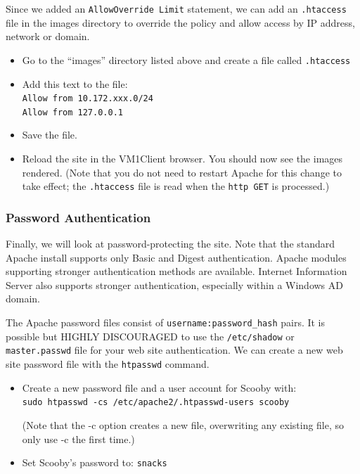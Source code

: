 \documentclass{article}
\begin{document}
Since we added an {\tt AllowOverride Limit} statement, we can add an {\tt .htaccess} file in the images directory to override the policy and allow access by IP address, network or domain. 
\begin{itemize}

\item Go to the ``images'' directory listed above and create a file called {\tt .htaccess}

\item Add this text to the file:\\
{\tt	Allow from 10.172.xxx.0/24}\\
{\tt	Allow from 127.0.0.1}

\item Save the file. 
\item Reload the site in the VM1Client browser. You should now see the images rendered. (Note that you do not need to restart Apache for this change to take effect; the {\tt .htaccess} file is read when the {\tt http GET} is processed.) 
\end{itemize}

\subsubsection{Password Authentication}

Finally, we will look at password-protecting the site. Note that the standard Apache install supports only Basic and Digest authentication. Apache modules supporting stronger authentication methods are available.  Internet Information Server also supports stronger authentication, especially within a Windows AD domain. 

The Apache password files consist of {\tt username:password\_hash} pairs. It is possible but HIGHLY DISCOURAGED to use the {\tt /etc/shadow} or {\tt master.passwd} file for your web site authentication. We can create a new web site password file with the {\tt htpasswd} command. 

\begin{itemize}
\item Create a new password file and a user account for Scooby with:\\
{\tt sudo htpasswd -cs /etc/apache2/.htpasswd-users scooby } 

(Note that the -c option creates a new file, overwriting any existing file, so only use -c the first time.)
\item Set Scooby's password to: {\tt snacks}
\end{itemize}
\end{document}

